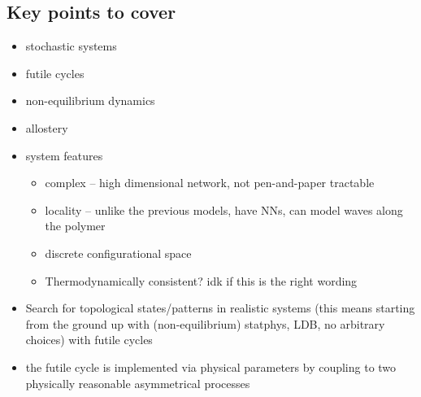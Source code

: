 \documentclass[11pt]{article}
\begin{document}
\subsection{Key points to cover}
\begin{itemize}
	\item stochastic systems
	\item futile cycles
	\item non-equilibrium dynamics
	\item allostery
	\item system features
	      \begin{itemize}
		      \item complex -- high dimensional network, not pen-and-paper tractable
		      \item locality -- unlike the previous models, have NNs, can model waves along the polymer
		      \item discrete configurational space
		      \item Thermodynamically consistent? idk if this is the right wording
	      \end{itemize}
	\item Search for topological states/patterns in realistic systems (this means starting from the ground up with (non-equilibrium) statphys, LDB, no arbitrary choices) with futile cycles
	\item the futile cycle is implemented via physical parameters by coupling to two physically reasonable asymmetrical processes
\end{itemize}

%
\end{document}
